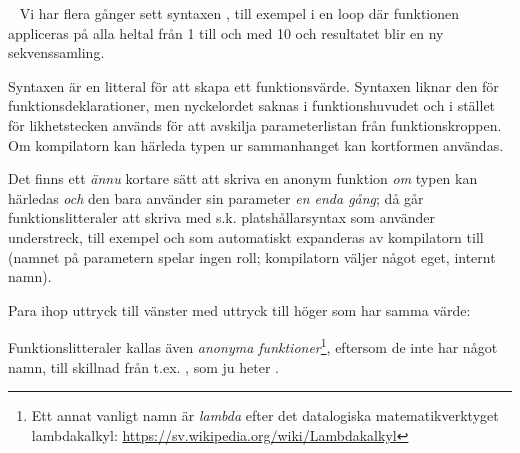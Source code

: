 
\QUESTBEGIN

\Task  \what~  Vi har flera gånger sett syntaxen , till exempel i en loop  där funktionen  appliceras på alla heltal från 1 till och med 10 och resultatet blir en ny sekvenssamling.

Syntaxen  är en litteral för att skapa ett funktionsvärde. Syntaxen liknar den för funktionsdeklarationer, men nyckelordet  saknas i funktionshuvudet och i stället för likhetstecken används \code{=>} för att avskilja parameterlistan från funktionskroppen.
Om kompilatorn kan härleda typen ur sammanhanget kan kortformen  användas.

Det finns ett \emph{ännu} kortare sätt att skriva en anonym funktion \emph{om} typen kan härledas \emph{och} den bara använder sin parameter \emph{en enda gång}; då går funktionslitteraler att skriva med s.k. platshållarsyntax som använder understreck, till exempel  och som automatiskt expanderas av kompilatorn till  (namnet på parametern spelar ingen roll; kompilatorn väljer något eget, internt namn).

Para ihop uttryck till vänster med uttryck till höger som har samma värde:

\begin{ConceptConnections}

\end{ConceptConnections}

\noindent
Funktionslitteraler kallas även \textit{anonyma funktioner}\footnote{Ett annat vanligt namn är \textit{lambda} efter det datalogiska matematikverktyget lambdakalkyl:  \url{https://sv.wikipedia.org/wiki/Lambdakalkyl}}, eftersom de inte har något namn, till skillnad från t.ex. , som ju heter .

\SOLUTION

\TaskSolved \what

\begin{ConceptConnections}
  
\end{ConceptConnections}

\QUESTEND



\clearpage

\ExtraTasks %



